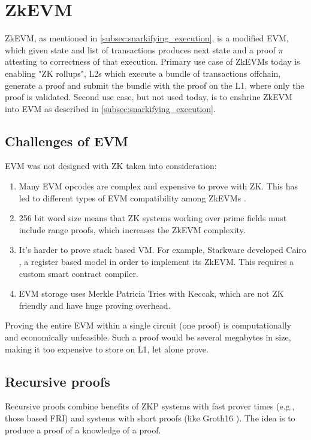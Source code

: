 \section{ZkEVM}\label{sec:zkevm}

ZkEVM, as mentioned in \ref{subsec:snarkifying_execution}, is a modified EVM,
which given state and list of transactions produces next state and a proof $\pi$
attesting to correctness of that execution. Primary use case of ZkEVMs today is
enabling "ZK rollups", L2s which execute a bundle of transactions offchain,
generate a proof and submit the bundle with the proof on the L1, where only the
proof is validated. Second use case, but not used today, is to enshrine ZkEVM
into EVM as described in \ref{subsec:snarkifying_execution}.

\subsection{Challenges of EVM}

EVM was not designed with ZK taken into consideration:

\begin{enumerate}
	\item Many EVM opcodes are complex and expensive to prove with ZK. This has
		led to different types of EVM compatibility among ZkEVMs \cite{VitalikButerinZkEVMTypes}.
	\item 256 bit word size means that ZK systems working over prime fields must
		include range proofs, which increases the ZkEVM complexity.
	\item It's harder to prove stack based VM. For example, Starkware developed
		Cairo \cite{Cairo}, a register based model in order to implement its ZkEVM.
		This requires a custom smart contract compiler.
	\item EVM storage uses Merkle Patricia Tries with Keccak, which are not
		ZK friendly and have huge proving overhead.
\end{enumerate}

Proving the entire EVM within a single circuit (one proof) is computationally
and economically unfeasible. Such a proof would be several megabytes in size,
making it too expensive to store on L1, let alone prove.

\subsection{Recursive proofs}

Recursive proofs combine benefits of ZKP systems with fast prover times (e.g.,
those based FRI) and systems with short proofs (like Groth16 \cite{Groth16}). The idea is to
produce a proof of a knowledge of a proof.

